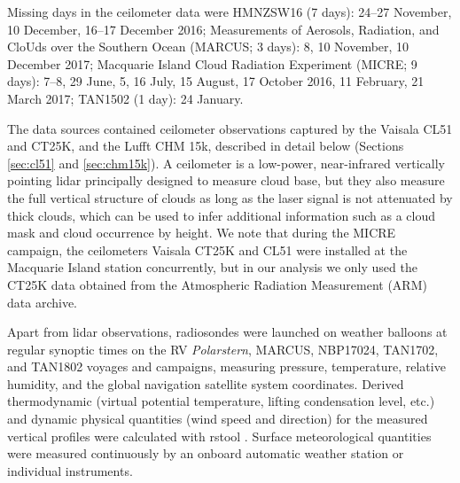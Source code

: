 \documentclass[draft]{agujournal2019}
\begin{document}
Missing days in the ceilometer data were HMNZSW16 (7 days): 24--27 November, 10 December, 16--17 December 2016; Measurements of Aerosols, Radiation, and CloUds over the Southern Ocean (MARCUS; 3 days): 8, 10 November, 10 December 2017; Macquarie Island Cloud Radiation Experiment (MICRE; 9 days): 7--8, 29 June, 5, 16 July, 15 August, 17 October 2016, 11 February, 21 March 2017; TAN1502 (1 day): 24 January.

The data sources contained ceilometer observations captured by the Vaisala CL51 and CT25K, and the Lufft CHM 15k, described in detail below (Sections \ref{sec:cl51} and \ref{sec:chm15k}). A ceilometer is a low-power, near-infrared vertically pointing lidar principally designed to measure cloud base, but they also measure the full vertical structure of clouds as long as the laser signal is not attenuated by thick clouds, which can be used to infer additional information such as a cloud mask and cloud occurrence by height. We note that during the MICRE campaign, the ceilometers Vaisala CT25K and CL51 were installed at the Macquarie Island station concurrently, but in our analysis we only used the CT25K data obtained from the Atmospheric Radiation Measurement (ARM) data archive.

Apart from lidar observations, radiosondes were launched on weather balloons at regular synoptic times on the RV \emph{Polarstern}, MARCUS, NBP17024, TAN1702, and TAN1802 voyages and campaigns, measuring pressure, temperature, relative humidity, and the global navigation satellite system coordinates. Derived thermodynamic (virtual potential temperature, lifting condensation level, etc.) and dynamic physical quantities (wind speed and direction) for the measured vertical profiles were calculated with rstool . Surface meteorological quantities were measured continuously by an onboard automatic weather station or individual instruments.
\end{document}
